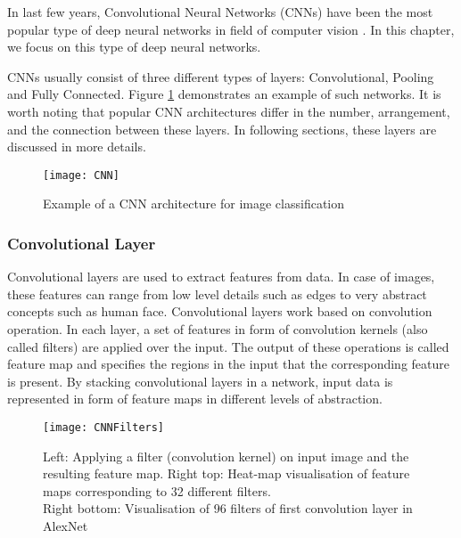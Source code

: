 In last few years, Convolutional Neural Networks (CNNs) have been the most popular type of deep neural networks in field of computer vision \cite{cnnpopular}. In this chapter, we focus on this type of deep neural networks. 

CNNs usually consist of three different types of layers: Convolutional, Pooling and Fully Connected. Figure \ref{fig:cnn} demonstrates an example of such networks. It is worth noting that popular CNN architectures differ in the number, arrangement, and the connection between these layers. In following sections, these layers are discussed in more details.

\begin{figure}
    \centering
    \texttt{[image: CNN]}
    \caption{Example of a CNN architecture for image classification }
    \label{fig:cnn}
\end{figure}

\subsubsection{Convolutional Layer}

Convolutional layers are used to extract features from data. In case of images, these features can range from low level details such as edges to very abstract concepts such as human face. Convolutional layers work based on convolution operation. In each layer, a set of features in form of convolution kernels (also called filters) are applied over the input. The output of these operations is called feature map and specifies the regions in the input that the corresponding feature is present. By stacking convolutional layers in a network, input data is represented in form of feature maps in different levels of abstraction.    

\begin{figure}[h]
    \centering
    \texttt{[image: CNNFilters]}
    \caption{Left: Applying a filter (convolution kernel) on input image and the resulting feature map. Right top: Heat-map visualisation of feature maps corresponding to 32 different filters. \\ Right bottom: Visualisation of 96 filters of first convolution layer in AlexNet \cite{alexnet} }
    \label{fig:CNNFilters}
\end{figure}

